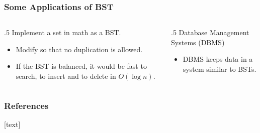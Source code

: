 \documentclass[10pt]{beamer}
\begin{document}
\begin{frame}[t]\frametitle{Some Applications of BST}
	\begin{columns}[T] %
	\begin{column}{.5\linewidth} %
	    	Implement a set in math as a BST.
		\begin{itemize}

			\item
			Modify  so that no duplication is allowed.

			\item
			If the BST is balanced,
			it would be fast to search, to insert and to delete in $O(\log n)$.
		\end{itemize}
	\end{column} %
	\begin{column}{.5\linewidth} %
	    	Database Management Systems (DBMS)
		\begin{itemize}
			\item
			DBMS keeps data in a system similar to BSTs.
		\end{itemize}
	\end{column} %
	\end{columns} %
\end{frame}




\begin{frame}[t,allowframebreaks]\frametitle{References}
	[text] %
%	
%	
%	
	
	\tiny %

	
\end{frame}

\end{document}

